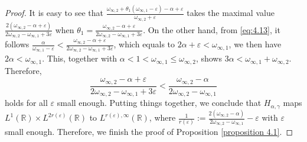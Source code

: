 \documentclass[10pt,a4paper]{amsart}
\begin{document}
\begin{proof}
It is easy to see that $\frac{\omega_{\infty,2}+ \theta_1(\omega_{\infty,1}-\varepsilon)-\alpha+\varepsilon}{\omega_{\infty,2}+\varepsilon}$ takes the maximal value $\frac{2(\omega_{\infty,2}-\alpha+\varepsilon)}{2\omega_{\infty,2}-\omega_{\infty,1}+3\varepsilon}$ when $\theta_1= \frac{\omega_{\infty,2}-\alpha+\varepsilon}{2\omega_{\infty,2}-\omega_{\infty,1}+3\varepsilon}$. On the other hand, from \eqref{eq:4.13}, it follows $\frac{\alpha}{\omega_{\infty,1}-\varepsilon}<\frac{\omega_{\infty,2}-\alpha+\varepsilon}{2\omega_{\infty,2}-\omega_{\infty,1}+3\varepsilon}$, which equals to $2\alpha+\varepsilon<\omega_{\infty,1}$, we then have $2\alpha<\omega_{\infty,1}$. This, together with $\alpha<1<\omega_{\infty,1}\leq\omega_{\infty,2}$, shows $3\alpha<\omega_{\infty,1}+\omega_{\infty,2}$. Therefore,
$$\frac{\omega_{\infty,2}-\alpha+\varepsilon}{2\omega_{\infty,2}-\omega_{\infty,1}+3\varepsilon}< \frac{\omega_{\infty,2}-\alpha}{2\omega_{\infty,2}-\omega_{\infty,1}}$$
holds for all $\varepsilon$ small enough. Putting things together, we conclude that $H_{\alpha,\gamma}$ maps $L^{1}(\mathbb{R})\times L^{2r( \varepsilon )   }(\mathbb{R})$ to $L^{r(\varepsilon ), \infty}(\mathbb{R})$, where $\frac{1}{r( \varepsilon ) }:=\frac{2(\omega_{\infty,2}-\alpha)}{2\omega_{\infty,2}-\omega_{\infty,1}}-\varepsilon $ with $\varepsilon$ small enough. Therefore, we finish the proof of Proposition \ref{proposition 4.1}.
\end{proof}
\end{document}
